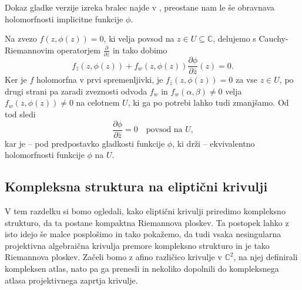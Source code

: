 \documentclass[mat1]{fmfdelo}
\numberwithin{equation}{section}
\newcommand{\C}{\mathbb C}
\newcommand{\pdv}[2][]{\frac{\partial#1}{\partial#2}}
\theoremstyle{definition}
\begin{document}
\begin{dokaz}
    Dokaz gladke verzije izreka bralec najde v \cite[izrek 14]{Globevnik}, preostane nam le še obravnava holomorfnosti implicitne funkcije $\phi$.

    Na zvezo $f(z, \phi(z)) = 0$, ki velja povsod na $z \in U \subseteq \C$, delujemo s Cauchy-Riemannovim operatorjem $\pdv{\bar{z}}$ in tako dobimo
    \[
        f_{\bar{z}}(z, \phi(z)) + f_{w}(z, \phi(z)) \pdv[\phi]{\bar{z}}(z) = 0.  
    \] 
    Ker je $f$ holomorfna v prvi spremenljivki, je $f_{\bar{z}}(z, \phi(z)) = 0$ za vse $z \in U$, po drugi strani pa zaradi zveznosti odvoda $f_w$ in $f_w(\alpha, \beta) \neq 0$ velja $f_{w}(z, \phi(z)) \neq 0$ na celotnem $U$, ki ga po potrebi lahko tudi zmanjšamo. Od tod sledi
    \[
        \pdv[\phi]{\bar{z}} = 0 \quad \text {povsod na $U$,}  
    \]
    kar je -- pod predpostavko gladkosti funkcije $\phi$, ki drži -- ekvivalentno holomorfnosti funkcije $\phi$ na $U$. 
\end{dokaz}






\subsection{Kompleksna struktura na eliptični krivulji}
\label{Kompleksna struktura na elipticni krivulji}

V tem razdelku si bomo ogledali, kako eliptični krivulji 
priredimo kompleksno strukturo, da ta postane kompaktna Riemannova ploskev. Ta postopek lahko z isto idejo še malce posplošimo in tako pokažemo, da tudi vsaka nesingularna projektivna algebraična krivulja premore kompleksno strukturo in je tako Riemannova ploskev.   
Začeli bomo z afino različico krivulje v $\C^2$, na njej definirali kompleksen atlas, nato pa ga prenesli in nekoliko dopolnili do kompleksnega atlasa projektivnega zaprtja krivulje.
\end{document}
